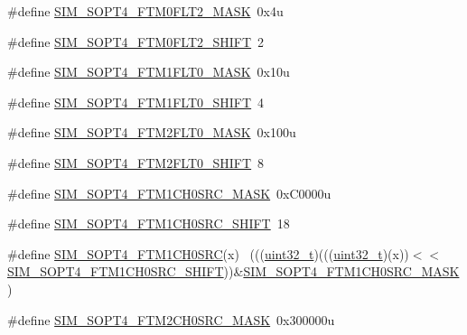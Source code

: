 \begin{DoxyCompactItemize}
\#define \hyperlink{group___s_i_m___register___masks_gafa0c4deac7488857fd22e28602b612fb}{S\+I\+M\+\_\+\+S\+O\+P\+T4\+\_\+\+F\+T\+M0\+F\+L\+T2\+\_\+\+M\+A\+SK}~0x4u
\item 
\#define \hyperlink{group___s_i_m___register___masks_gacca0c622cfa1e0c7e7214096c38c6557}{S\+I\+M\+\_\+\+S\+O\+P\+T4\+\_\+\+F\+T\+M0\+F\+L\+T2\+\_\+\+S\+H\+I\+FT}~2
\item 
\#define \hyperlink{group___s_i_m___register___masks_ga605f729e3f4faddc18e957c077adf61a}{S\+I\+M\+\_\+\+S\+O\+P\+T4\+\_\+\+F\+T\+M1\+F\+L\+T0\+\_\+\+M\+A\+SK}~0x10u
\item 
\#define \hyperlink{group___s_i_m___register___masks_ga9fb8861affd661f64719260a43a87ec6}{S\+I\+M\+\_\+\+S\+O\+P\+T4\+\_\+\+F\+T\+M1\+F\+L\+T0\+\_\+\+S\+H\+I\+FT}~4
\item 
\#define \hyperlink{group___s_i_m___register___masks_ga4f61f56a63a5d239be393708c17cf82c}{S\+I\+M\+\_\+\+S\+O\+P\+T4\+\_\+\+F\+T\+M2\+F\+L\+T0\+\_\+\+M\+A\+SK}~0x100u
\item 
\#define \hyperlink{group___s_i_m___register___masks_ga15275ae91c6efbf697f472b940369401}{S\+I\+M\+\_\+\+S\+O\+P\+T4\+\_\+\+F\+T\+M2\+F\+L\+T0\+\_\+\+S\+H\+I\+FT}~8
\item 
\#define \hyperlink{group___s_i_m___register___masks_ga8be459723f070708becab666dc6abc47}{S\+I\+M\+\_\+\+S\+O\+P\+T4\+\_\+\+F\+T\+M1\+C\+H0\+S\+R\+C\+\_\+\+M\+A\+SK}~0x\+C0000u
\item 
\#define \hyperlink{group___s_i_m___register___masks_gaee4e8fb1805bded49220a407c1620345}{S\+I\+M\+\_\+\+S\+O\+P\+T4\+\_\+\+F\+T\+M1\+C\+H0\+S\+R\+C\+\_\+\+S\+H\+I\+FT}~18
\item 
\#define \hyperlink{group___s_i_m___register___masks_gadce9eb5cf4628062440e4c30611c8681}{S\+I\+M\+\_\+\+S\+O\+P\+T4\+\_\+\+F\+T\+M1\+C\+H0\+S\+RC}(x)                                ~(((\hyperlink{_p_e___types_8h_a33594304e786b158f3fb30289278f5af}{uint32\+\_\+t})(((\hyperlink{_p_e___types_8h_a33594304e786b158f3fb30289278f5af}{uint32\+\_\+t})(x))$<$$<$\hyperlink{group___s_i_m___register___masks_gaee4e8fb1805bded49220a407c1620345}{S\+I\+M\+\_\+\+S\+O\+P\+T4\+\_\+\+F\+T\+M1\+C\+H0\+S\+R\+C\+\_\+\+S\+H\+I\+FT}))\&\hyperlink{group___s_i_m___register___masks_ga8be459723f070708becab666dc6abc47}{S\+I\+M\+\_\+\+S\+O\+P\+T4\+\_\+\+F\+T\+M1\+C\+H0\+S\+R\+C\+\_\+\+M\+A\+SK})
\item 
\#define \hyperlink{group___s_i_m___register___masks_ga0dcacc22852e0ee0a7a853a51b422b70}{S\+I\+M\+\_\+\+S\+O\+P\+T4\+\_\+\+F\+T\+M2\+C\+H0\+S\+R\+C\+\_\+\+M\+A\+SK}~0x300000u
$$
\end{DoxyCompactItemize}
